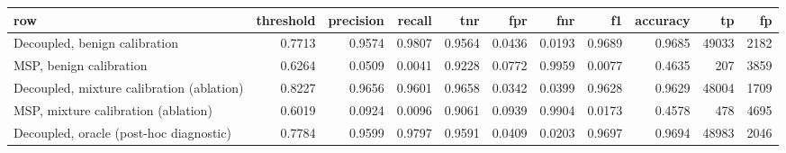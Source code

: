 \begin{tabular}{lrrrrrrrrrr}
\toprule
row & threshold & precision & recall & tnr & fpr & fnr & f1 & accuracy & tp & fp \\
\midrule
Decoupled, benign calibration & 0.7713 & 0.9574 & 0.9807 & 0.9564 & 0.0436 & 0.0193 & 0.9689 & 0.9685 & 49033 & 2182 \\
MSP, benign calibration & 0.6264 & 0.0509 & 0.0041 & 0.9228 & 0.0772 & 0.9959 & 0.0077 & 0.4635 & 207 & 3859 \\
Decoupled, mixture calibration (ablation) & 0.8227 & 0.9656 & 0.9601 & 0.9658 & 0.0342 & 0.0399 & 0.9628 & 0.9629 & 48004 & 1709 \\
MSP, mixture calibration (ablation) & 0.6019 & 0.0924 & 0.0096 & 0.9061 & 0.0939 & 0.9904 & 0.0173 & 0.4578 & 478 & 4695 \\
Decoupled, oracle (post-hoc diagnostic) & 0.7784 & 0.9599 & 0.9797 & 0.9591 & 0.0409 & 0.0203 & 0.9697 & 0.9694 & 48983 & 2046 \\
\bottomrule
\end{tabular}
